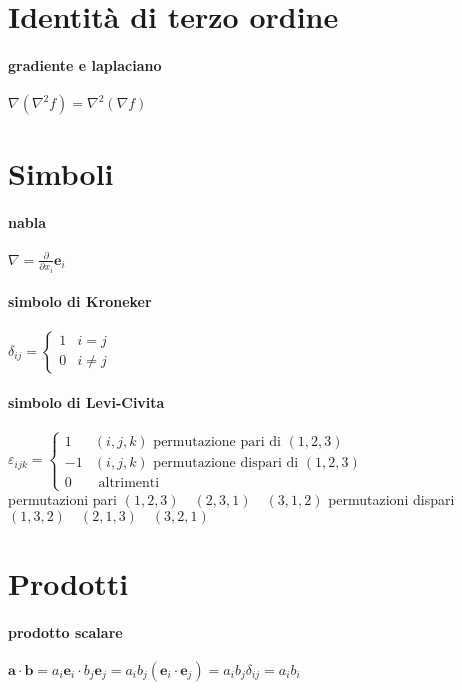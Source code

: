 \documentclass[10pt,a4paper]{article}
\begin{document}
	\section{Identità di terzo ordine}
\paragraph{gradiente e laplaciano} $\nabla(\nabla^2 f) = \nabla^2(\nabla f)$

	\section{Simboli}
\paragraph{nabla}
$\nabla = \frac{\partial}{\partial x_i} \mathbf e_i$

\paragraph{simbolo di Kroneker}
$\delta_{ij} = \begin{cases} 1&i=j \\ 0&i\neq j \end{cases}$
	
\paragraph{simbolo di Levi-Civita}
$\varepsilon_{ijk} = \begin{cases} 1&(i,j,k) \text{ permutazione pari di }(1,2,3) \\ -1&(i,j,k) \text{ permutazione dispari di }(1,2,3) \\0&\text{ altrimenti}\end{cases}$\\
permutazioni pari $(1,2,3) \quad (2,3,1) \quad (3,1,2)$ \qquad permutazioni dispari $(1,3,2) \quad (2,1,3) \quad (3,2,1)$



	\section{Prodotti}
\paragraph{prodotto scalare}
$\mathbf a \cdot \mathbf b = a_i \mathbf e_i \cdot b_j \mathbf e_j = a_i b_j (\mathbf e_i \cdot \mathbf e_j) =a_i b_j \delta_{ij} = a_i b_i$
\end{document}
